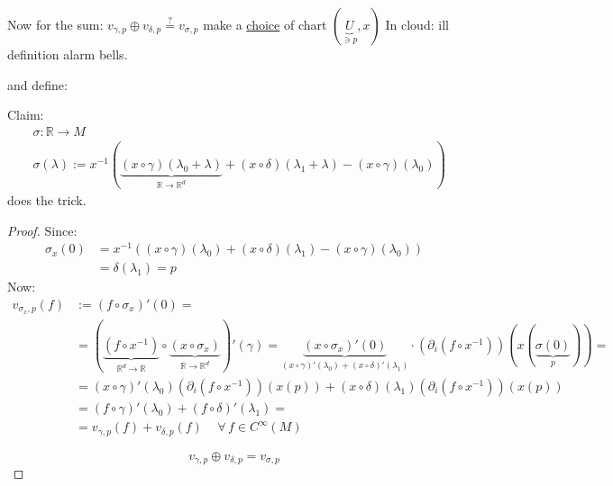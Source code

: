 Now for the sum: %
$v_{\gamma,p} \oplus v_{\delta,p} \overset{?}{=} v_{\sigma, p} $
make a \underline{choice} of chart $(\underbrace{U}_{\ni p} , x)$  In cloud: ill definition alarm bells. 

and define:

Claim:
\[
\begin{aligned}
  & \sigma : \mathbb{R} \to M \\
  & \sigma(\lambda) := x^{-1}( \underbrace{ (x\circ \gamma)(\lambda_0 + \lambda)}_{\mathbb{R} \to \mathbb{R}^d}  + (x\circ \delta)(\lambda_1+ \lambda) - (x\circ \gamma)(\lambda_0) )
\end{aligned}
\]
does the trick.
\begin{proof}
Since: 
\[
\begin{aligned}
  \sigma_x(0) & = x^{-1}((x\circ \gamma)(\lambda_0) + (x\circ \delta)(\lambda_1) - (x\circ \gamma)(\lambda_0)) \\
  & = \delta(\lambda_1) = p \end{aligned}
\]
Now:
\[
\begin{aligned}
  v_{\sigma_x,p}(f) & := (f\circ \sigma_x)'(0) =  \\ 
  & = ( \underbrace{ (f\circ x^{-1}) }_{\mathbb{R}^d \to \mathbb{R}}  \circ \underbrace{ (x\circ \sigma_x) }_{\mathbb{R} \to \mathbb{R}^d}  )'(\gamma) = \underbrace{ (x\circ \sigma_x)'(0) }_{(x\circ \gamma)'(\lambda_0) + (x\circ \delta)'(\lambda_1) } \cdot \left( \partial_i (f\circ x^{-1}) \right)(x( \underbrace{ \sigma(0)}_{p} ) ) = \\
  & = (x\circ \gamma)'(\lambda_0)(\partial_i (f\circ x^{-1}) )(x(p)) + (x\circ \delta)(\lambda_1)(\partial_i (f\circ x^{-1})  )(x(p)) \\
  & = (f\circ \gamma)'(\lambda_0) + (f\circ \delta)'(\lambda_1) = \\
  & = v_{\gamma,p}(f) + v_{\delta,p}(f) \quad \, \forall \, f \in C^{\infty}(M)
\end{aligned}
\]

\[
\boxed{ v_{\gamma,p} \oplus v_{\delta,p} = v_{\sigma, p} }
\]
\end{proof}



